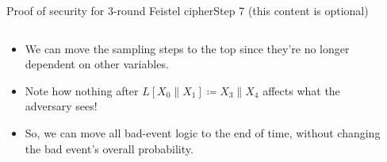 \documentclass[aspectratio=169, lualatex, handout]{beamer}
\begin{document}
	\begin{frame}{Proof of security for 3-round Feistel cipher}{Step 7 (this content is optional)}
		\begin{columns}[c]
			\begin{column}{0.5\textwidth}
				\begin{itemize}
					\item We can move the sampling steps to the top since they're no longer dependent on other variables.
					\item Note how nothing after $L[X_0\|X_1] \coloneq X_3\|X_4$ affects what the adversary sees!
					\item So, we can move all bad-event logic to the end of time, without changing the bad event's overall probability.
				\end{itemize}
			\end{column}
			\begin{column}{0.5\textwidth}
				\vspace{-1.5cm}
				\begin{center}
				\end{center}
			\end{column}
		\end{columns}
	\end{frame}
\end{document}
